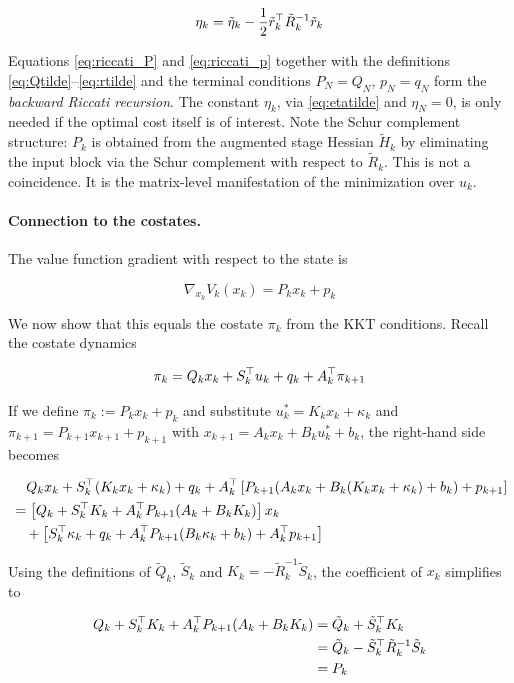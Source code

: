 \[
\eta_k = \tilde{\eta}_k - \frac{1}{2}\tilde{r}_k^\top \tilde{R}_k^{-1} \tilde{r}_k
\]

Equations \eqref{eq:riccati_P} and \eqref{eq:riccati_p} together with the definitions \eqref{eq:Qtilde}--\eqref{eq:rtilde} and the terminal conditions $P_N = Q_N$, $p_N = q_N$ form the \textit{backward Riccati recursion}.
The constant $\eta_k$, via \eqref{eq:etatilde} and $\eta_N = 0$, is only needed if the optimal cost itself is of interest.
Note the Schur complement structure: $P_k$ is obtained from the augmented stage Hessian $\tilde{H}_k$ by eliminating the input block via the Schur complement with respect to $\tilde{R}_k$.
This is not a coincidence.
It is the matrix-level manifestation of the minimization over $u_k$.

\paragraph{Connection to the costates.}
The value function gradient with respect to the state is

\[
\nabla_{x_k} V_k(x_k) = P_k x_k + p_k
\]

We now show that this equals the costate $\pi_k$ from the KKT conditions.
Recall the costate dynamics

\[
\pi_k = Q_k x_k + S_k^\top u_k + q_k + A_k^\top \pi_{k+1}
\]

If we define $\pi_k := P_k x_k + p_k$ and substitute $u_k^* = K_k x_k + \kappa_k$ and $\pi_{k+1} = P_{k+1} x_{k+1} + p_{k+1}$ with $x_{k+1} = A_k x_k + B_k u_k^* + b_k$, the right-hand side becomes

\begin{align*}
&\phantom{=}\; Q_k x_k + S_k^\top (K_k x_k + \kappa_k) + q_k + A_k^\top \left[ P_{k+1}(A_k x_k + B_k (K_k x_k + \kappa_k) + b_k) + p_{k+1} \right] \\
&= \left[ Q_k + S_k^\top K_k + A_k^\top P_{k+1}(A_k + B_k K_k) \right] x_k \\
&\quad + \left[ S_k^\top \kappa_k + q_k + A_k^\top P_{k+1}(B_k \kappa_k + b_k) + A_k^\top p_{k+1} \right]
\end{align*}

Using the definitions of $\tilde{Q}_k$, $\tilde{S}_k$ and $K_k = -\tilde{R}_k^{-1}\tilde{S}_k$, the coefficient of $x_k$ simplifies to

\begin{align*}
Q_k + S_k^\top K_k + A_k^\top P_{k+1}(A_k + B_k K_k)
&= \tilde{Q}_k + \tilde{S}_k^\top K_k \\
&= \tilde{Q}_k - \tilde{S}_k^\top \tilde{R}_k^{-1} \tilde{S}_k \\
&= P_k
\end{align*}

